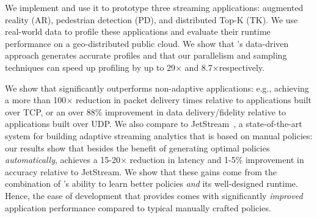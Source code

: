 \begin{enumerate}[leftmargin=*]
\end{enumerate}

We implement \sysname{} and use it to prototype three streaming applications:
augmented reality (AR), pedestrian detection (PD), and distributed Top-K
(TK). We use real-world data to profile these applications and evaluate their
runtime performance on a geo-distributed public cloud.  We show that
\sysname{}'s data-driven approach generates accurate profiles and that our
parallelism and sampling techniques can speed up profiling by up to 29$\times$
and 8.7$\times$\@ respectively.

We show that \sysname{} significantly outperforms non-adaptive applications:
e.g., achieving a more than 100$\times$ reduction in packet delivery times
relative to applications built over TCP, or an over 88\% improvement in data
delivery/fidelity relative to applications built over UDP.  We also compare
\sysname{} to JetStream~\cite{rabkin2014aggregation}, a state-of-the-art system
for building adaptive streaming analytics that is based on manual policies: our
results show that besides the benefit of generating optimal policies
\textit{automatically}, \sysname{} achieves a 15-20$\times$ reduction in latency
and 1-5\% improvement in accuracy relative to JetStream. We show that these
gains come from the combination of \sysname{}'s ability to learn better policies
\emph{and} its well-designed runtime.  Hence, the ease of development that
\sysname{} provides comes with significantly \emph{improved} application
performance compared to typical manually crafted policies.

